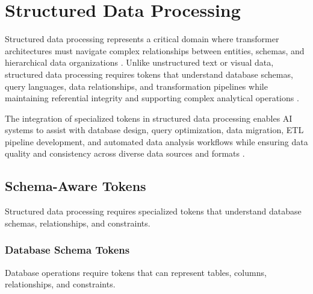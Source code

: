 
\section{Structured Data Processing}

Structured data processing represents a critical domain where transformer architectures must navigate complex relationships between entities, schemas, and hierarchical data organizations \citep{yu2018spider, scholak2021picard}. Unlike unstructured text or visual data, structured data processing requires tokens that understand database schemas, query languages, data relationships, and transformation pipelines while maintaining referential integrity and supporting complex analytical operations \citep{li2023can, pourreza2024din}.
\begin{comment}
Feedback: This is a good introduction. To make the core challenge more vivid, you could add: "The fundamental challenge in this domain is that the meaning of a token is almost entirely defined by its context within a rigid schema. The word 'Apple' in a `company_name` column means something completely different from 'Apple' in a `fruit_type` column. Special tokens are therefore essential for providing this schema-level context that is invisible in the raw data itself."
\end{comment}

The integration of specialized tokens in structured data processing enables AI systems to assist with database design, query optimization, data migration, ETL pipeline development, and automated data analysis workflows while ensuring data quality and consistency across diverse data sources and formats \citep{gao2023text}.

\subsection{Schema-Aware Tokens}

Structured data processing requires specialized tokens that understand database schemas, relationships, and constraints.

\subsubsection{Database Schema Tokens}

Database operations require tokens that can represent tables, columns, relationships, and constraints.
\begin{comment}
Feedback: Before linking to the code, it's crucial to explain the motivation. For example: "When a user asks, 'Show me the biggest customers,' a model must translate this into a valid SQL query. To do this, it needs to know that 'customers' maps to a table named `customers`, and 'biggest' likely refers to a column like `total_revenue`. Schema-aware tokens, such as `<TABLE>`, `<COLUMN>`, and `<KEY>`, are used to linearize the database schema into a sequence the transformer can understand. This allows the model to learn the mapping between natural language questions and the specific structural elements of the database."
\end{comment}

